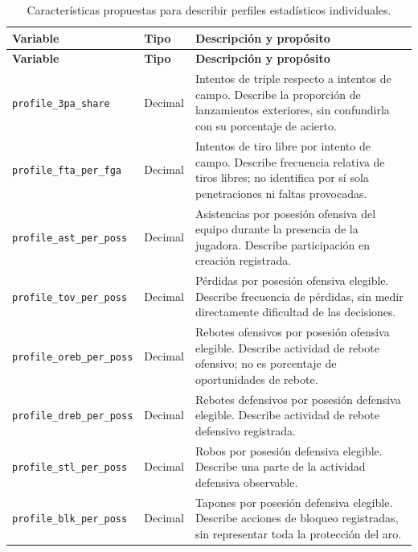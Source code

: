 \begingroup
\small
{}
\begin{longtable}{@{}>{\raggedright\arraybackslash}p{4.5cm}>{\raggedright\arraybackslash}p{1.6cm}>{\raggedright\arraybackslash}p{8.0cm}@{}}
\caption{Características propuestas para describir perfiles estadísticos individuales.}\label{tab:variables-clustering}\\
\toprule\textbf{Variable}&\textbf{Tipo}&\textbf{Descripción y propósito}\\\midrule\endfirsthead
\toprule\textbf{Variable}&\textbf{Tipo}&\textbf{Descripción y propósito}\\\midrule\endhead
\bottomrule\endlastfoot
\texttt{profile\_\allowbreak 3pa\_\allowbreak share}&Decimal&Intentos de triple respecto a intentos de campo. Describe la proporción de lanzamientos exteriores, sin confundirla con su porcentaje de acierto.\\
\texttt{profile\_\allowbreak fta\_\allowbreak per\_\allowbreak fga}&Decimal&Intentos de tiro libre por intento de campo. Describe frecuencia relativa de tiros libres; no identifica por sí sola penetraciones ni faltas provocadas.\\
\texttt{profile\_\allowbreak ast\_\allowbreak per\_\allowbreak poss}&Decimal&Asistencias por posesión ofensiva del equipo durante la presencia de la jugadora. Describe participación en creación registrada.\\
\texttt{profile\_\allowbreak tov\_\allowbreak per\_\allowbreak poss}&Decimal&Pérdidas por posesión ofensiva elegible. Describe frecuencia de pérdidas, sin medir directamente dificultad de las decisiones.\\
\texttt{profile\_\allowbreak oreb\_\allowbreak per\_\allowbreak poss}&Decimal&Rebotes ofensivos por posesión ofensiva elegible. Describe actividad de rebote ofensivo; no es porcentaje de oportunidades de rebote.\\
\texttt{profile\_\allowbreak dreb\_\allowbreak per\_\allowbreak poss}&Decimal&Rebotes defensivos por posesión defensiva elegible. Describe actividad de rebote defensivo registrada.\\
\texttt{profile\_\allowbreak stl\_\allowbreak per\_\allowbreak poss}&Decimal&Robos por posesión defensiva elegible. Describe una parte de la actividad defensiva observable.\\
\texttt{profile\_\allowbreak blk\_\allowbreak per\_\allowbreak poss}&Decimal&Tapones por posesión defensiva elegible. Describe acciones de bloqueo registradas, sin representar toda la protección del aro.\\
\end{longtable}
\endgroup

